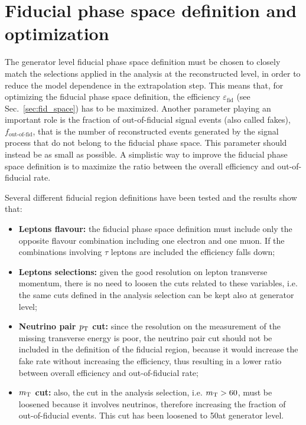 \chapter{Fiducial phase space definition and optimization}\label{app:fiducial_region}
\thispagestyle{empty}
	
The generator level fiducial phase space definition must be chosen to closely match the selections applied in the analysis at the reconstructed level, in order to reduce the model dependence in the extrapolation step. This means that, for optimizing the fiducial phase space definition, the efficiency $\varepsilon_\mathrm{fid}$ (see Sec.~\ref{sec:fid_space}) has to be maximized. Another parameter playing an important role is the fraction of out-of-fiducial signal events (also called fakes), $f_\text{out-of-fid}$, that is the number of reconstructed events generated by the signal process that do not belong to the fiducial phase space. This parameter should instead be as small as possible. A simplistic way to improve the fiducial phase space definition is to maximize the ratio between the overall efficiency and out-of-fiducial rate.

Several different fiducial region definitions have been tested and the results show that:
\begin{itemize}
\item {\bf Leptons flavour:} the fiducial phase space definition must include only the opposite flavour combination including one electron and one muon. If the combinations involving $\tau$ leptons are included the efficiency falls down;
\item {\bf Leptons selections:} given the good resolution on lepton transverse momentum, there is no need to loosen the cuts related to these variables, i.e. the same cuts defined in the analysis selection can be kept also at generator level;
\item {\bf Neutrino pair \boldmath$p_\mathrm{T}$ cut:} since the resolution on the measurement of the missing transverse energy is poor, the neutrino pair cut should not be included in the definition of the fiducial region, because it would increase the fake rate without increasing the efficiency, thus resulting in a lower ratio between overall efficiency and out-of-fiducial rate;
\item {\bf \boldmath$m_\mathrm{T}$ cut:} also, the \mt cut in the analysis selection, i.e. $m_\mathrm{T}>60$\GeV, must be loosened because it involves neutrinos, therefore increasing the fraction of out-of-fiducial events. This cut has been loosened to 50\GeV at generator level.
\end{itemize}

